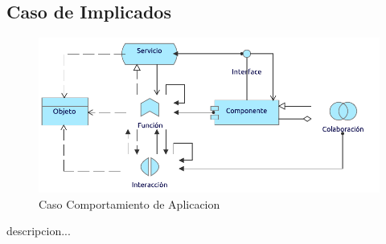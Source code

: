 \newpage

\subsection{Caso  de Implicados}
\begin{figure}[h!]
	\centering
	\includegraphics[width=.8\linewidth]{imgs/caso/CmtoAplicacion}
	\caption{Caso Comportamiento de Aplicacion}
\end{figure}
descripcion...

\newpage